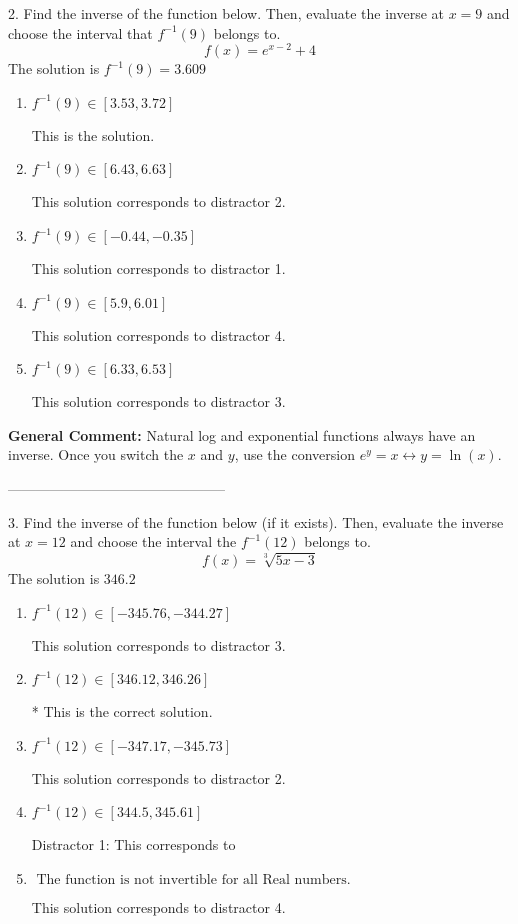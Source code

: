 \documentclass{extbook}[14pt]
\begin{document}
2. Find the inverse of the function below. Then, evaluate the inverse at $x = 9$ and choose the interval that $f^{-1}(9)$ belongs to.
\[ f(x) = e^{x-2}+4 \] 
The solution is $ f^{-1}(9) = 3.609 $ 

\begin{enumerate}[label=\Alph*.] 
\item $ f^{-1}(9) \in [3.53, 3.72] $ 

  This is the solution. 
\item $ f^{-1}(9) \in [6.43, 6.63] $ 

  This solution corresponds to distractor 2. 
\item $ f^{-1}(9) \in [-0.44, -0.35] $ 

  This solution corresponds to distractor 1. 
\item $ f^{-1}(9) \in [5.9, 6.01] $ 

  This solution corresponds to distractor 4. 
\item $ f^{-1}(9) \in [6.33, 6.53] $ 

  This solution corresponds to distractor 3. 
\end{enumerate} 
 
\textbf{General Comment:} Natural log and exponential functions always have an inverse. Once you switch the $x$ and $y$, use the conversion $ e^y = x \leftrightarrow y=\ln(x)$. 

-----------------------------------------------

3. Find the inverse of the function below (if it exists). Then, evaluate the inverse at $x = 12$ and choose the interval the $f^{-1}(12)$ belongs to.
\[ f(x) = \sqrt[3]{5 x - 3} \] 
The solution is $ 346.2 $ 

\begin{enumerate}[label=\Alph*.] 
\item $ f^{-1}(12) \in [-345.76, -344.27] $ 

  This solution corresponds to distractor 3. 
\item $ f^{-1}(12) \in [346.12, 346.26] $ 

 * This is the correct solution. 
\item $ f^{-1}(12) \in [-347.17, -345.73] $ 

  This solution corresponds to distractor 2. 
\item $ f^{-1}(12) \in [344.5, 345.61] $ 

  Distractor 1: This corresponds to  
\item $ \text{ The function is not invertible for all Real numbers. } $ 

  This solution corresponds to distractor 4. 
\end{enumerate} 
 
\end{document}
